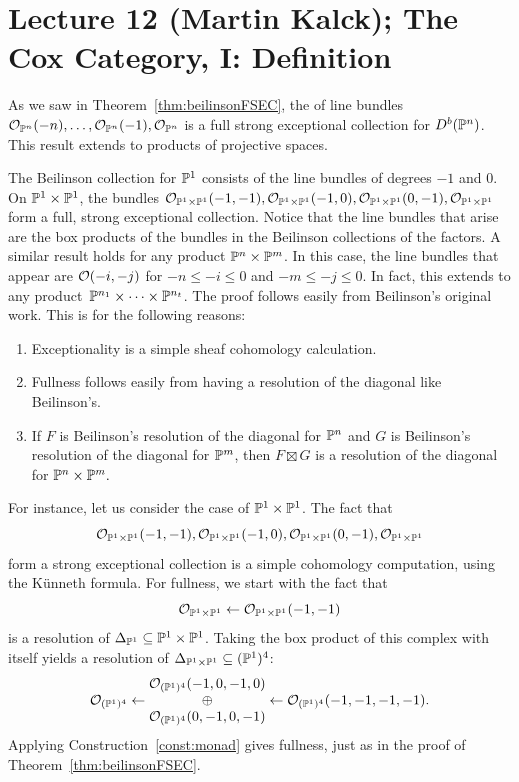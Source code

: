 \documentclass{amsart}
\begin{document}
\fi

\section{Lecture 12 (Martin Kalck); The Cox Category, I: Definition}\label{lec:12-DCox-definition}
As we saw in Theorem~\ref{thm:beilinsonFSEC}, the
 of line bundles ${\mathcal O}_{\mathbb P^n}(-n), \ldots,
{\mathcal O}_{\mathbb P^n}(-1), {\mathcal O}_{\mathbb P^n}$ is a full strong exceptional collection for $D^b(\mathbb P^n)$. This result extends to products of projective spaces.  

\begin{example}
    The Beilinson collection for $\mathbb P^1$ consists of the line bundles of degrees $-1$ and $0$.   On $\mathbb P^1\times \mathbb P^1$, the bundles ${\mathcal O}_{\mathbb P^1\times \mathbb P^1}(-1,-1),{\mathcal O}_{\mathbb P^1\times \mathbb P^1}(-1,0), {\mathcal O}_{\mathbb P^1\times \mathbb P^1}(0,-1),{\mathcal O}_{\mathbb P^1\times \mathbb P^1}$ form a full, strong exceptional collection.  Notice that the line bundles that arise are the box products of the bundles in the Beilinson collections of the factors. A similar result holds for any product $\mathbb P^n\times \mathbb P^m$.  In this case, the line bundles that appear are ${\mathcal O}(-i,-j)$ for $-n \leq -i \leq 0$ and $-m \leq -j \leq 0$.  In fact, this extends to any product~$\mathbb P^{n_1} \times \cdots \times \mathbb P^{n_t}$. The proof follows easily from Beilinson's original work.  This is for the following reasons:
    \begin{enumerate}
        \item Exceptionality is a simple sheaf cohomology calculation.
        \item Fullness follows easily from having a resolution of the diagonal like Beilinson's.
        \item If $F$ is Beilinson's resolution of the diagonal for $\mathbb P^n$ and $G$ is Beilinson's resolution of the diagonal for $\mathbb P^m$, then $F\boxtimes G$ is a resolution of the diagonal for $\mathbb P^n\times \mathbb P^m.$
    \end{enumerate}
    For instance, let us consider the case of $\mathbb P^1 \times \mathbb P^1$. The fact that
    \[
    {\mathcal O}_{\mathbb P^1\times \mathbb P^1}(-1,-1),{\mathcal O}_{\mathbb P^1\times \mathbb P^1}(-1,0), {\mathcal O}_{\mathbb P^1\times \mathbb P^1}(0,-1),{\mathcal O}_{\mathbb P^1\times \mathbb P^1}
    \]form a strong exceptional collection is a simple cohomology computation, using the K\"unneth formula.  For fullness, we start with the fact that
    \[
    {\mathcal O}_{\mathbb P^1 \times \mathbb P^1} \gets {\mathcal O}_{\mathbb P^1 \times \mathbb P^1}(-1,-1)
    \]
     is a resolution of $\Delta_{\mathbb P^1} \subseteq \mathbb P^1 \times \mathbb P^1$.  Taking the box product of this complex with itself yields a resolution of $\Delta_{\mathbb P^1 \times \mathbb P^1} \subseteq (\mathbb P^1)^4$:
     \[
    {\mathcal O}_{(\mathbb P^1)^4} \gets
    \begin{matrix}
      {\mathcal O}_{(\mathbb P^1)^4}(-1,0,-1,0)\\
      \oplus \\
      {\mathcal O}_{(\mathbb P^1)^4}(0,-1,0,-1)
    \end{matrix}
    \gets
     {\mathcal O}_{(\mathbb P^1)^4}(-1,-1,-1,-1) .
     \]
Applying Construction~\ref{const:monad} gives fullness, just as in the proof of Theorem~\ref{thm:beilinsonFSEC}.
\end{example}
\end{document}

